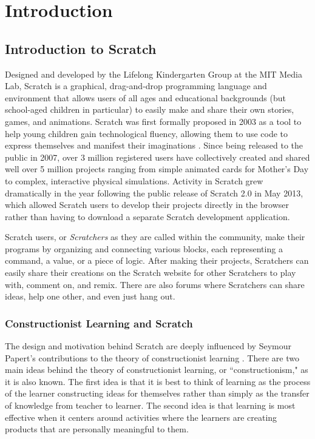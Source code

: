 \chapter{Introduction} 
\section{Introduction to Scratch}
Designed and developed by the Lifelong Kindergarten Group at the MIT Media Lab, Scratch is a graphical, drag-and-drop programming language and environment that allows users of all ages and educational backgrounds (but school-aged children in particular) to easily make and share their own stories, games, and animations\cite{ProgrammingForAll, Monroy-Hernandez}. Scratch was first formally proposed in 2003 as a tool to help young children gain technological fluency, allowing them to use code to express themselves and manifest their imaginations \cite{ScratchProposal}. Since being released to the public in 2007, over 3 million registered users have collectively created and shared well over 5 million projects \cite{ScratchStats} ranging from simple animated cards for Mother's Day to complex, interactive physical simulations. Activity in Scratch grew dramatically in the year following the public release of Scratch 2.0 in May 2013, which allowed Scratch users to develop their projects directly in the browser rather than having to download a separate Scratch development application. 

Scratch users, or \emph{Scratchers} as they are called within the community, make their programs by organizing and connecting various blocks, each representing a command, a value, or a piece of logic. After making their projects, Scratchers can easily share their creations on the Scratch website for other Scratchers to play with, comment on, and remix. There are also forums where Scratchers can share ideas, help one other, and even just hang out.

\subsection{Constructionist Learning and Scratch}
The design and motivation behind Scratch are deeply influenced by Seymour Papert's contributions to the theory of constructionist learning \cite{Papert}. There are two main ideas behind the theory of constructionist learning, or ``constructionism," as it is also known. The first idea is that it is best to think of learning as the process of the learner constructing ideas for themselves rather than simply as the transfer of knowledge from teacher to learner. The second idea is that learning is most effective when it centers around activities where the learners are creating products that are personally meaningful to them.

